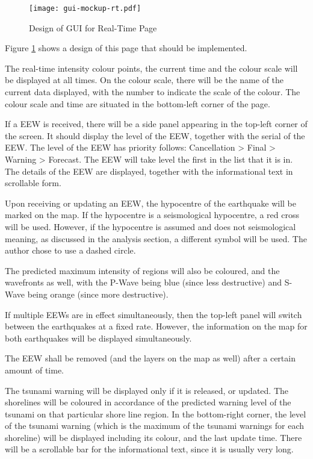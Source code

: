 \begin{figure}[htp]
    \centering
    \texttt{[image: gui-mockup-rt.pdf]}
    \caption{Design of GUI for Real-Time Page}
    \label{fig:gui-mockup-rt}
\end{figure}

Figure \ref{fig:gui-mockup-rt} shows a design of this page that should be implemented.

The real-time intensity colour points, the current time and the colour scale will be displayed at all times. On the colour scale, there will be the name of the current data displayed, with the number to indicate the scale of the colour. The colour scale and time are situated in the bottom-left corner of the page.

If a EEW is received, there will be a side panel appearing in the top-left corner of the screen. It should display the level of the EEW, together with the serial of the EEW. The level of the EEW has priority follows: Cancellation > Final > Warning > Forecast. The EEW will take level the first in the list that it is in. The details of the EEW are displayed, together with the informational text in scrollable form.

Upon receiving or updating an EEW, the hypocentre of the earthquake will be marked on the map. If the hypocentre is a seismological hypocentre, a red cross will be used. However, if the hypocentre is assumed and does not seismological meaning, as discussed in the analysis section, a different symbol will be used. The author chose to use a dashed circle.

The predicted maximum intensity of regions will also be coloured, and the wavefronts as well, with the P-Wave being blue (since less destructive) and S-Wave being orange (since more destructive).

If multiple EEWs are in effect simultaneously, then the top-left panel will switch between the earthquakes at a fixed rate. However, the information on the map for both earthquakes will be displayed simultaneously.

The EEW shall be removed (and the layers on the map as well) after a certain amount of time.

The tsunami warning will be displayed only if it is released, or updated. The shorelines will be coloured in accordance of the predicted warning level of the tsunami on that particular shore line region. In the bottom-right corner, the level of the tsunami warning (which is the maximum of the tsunami warnings for each shoreline) will be displayed including its colour, and the last update time. There will be a scrollable bar for the informational text, since it is usually very long.

